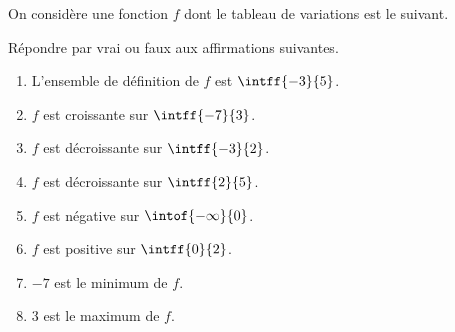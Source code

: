 \begin{exo}{}
	On considère une fonction $f$ dont le tableau de variations est le suivant.

	\begin{center}
	\end{center}

	Répondre par vrai ou faux aux affirmations suivantes.

	\begin{enumerate}
		\item L'ensemble de définition de $f$ est $\intff{-3}{5}$.
		\item $f$ est croissante sur $\intff{-7}{3}$.
		\item $f$ est décroissante sur $\intff{-3}{2}$.
		\item $f$ est décroissante sur $\intff{2}{5}$.
		\item $f$ est négative sur $\intof{-\infty}{0}$.
		\item $f$ est positive sur $\intff{0}{2}$.
		\item $-7$ est le minimum de $f$.
		\item $3$ est le maximum de $f$.
	\end{enumerate}
\end{exo}

